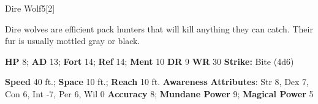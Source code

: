   \begin{monsection}{Dire Wolf}{5}[2]
    \vspace{-1em}\vspace{-1em}
    \vspace{0em}

    
      Dire wolves are efficient pack hunters that will kill anything they can catch.
      Their fur is usually mottled gray or black.
    

    \begin{spellcontent}
      \begin{spelltargetinginfo}
        \pari \textbf{HP} 8;
          \textbf{AD} 13;
          \textbf{Fort} 14;
          \textbf{Ref} 14;
          \textbf{Ment} 10
        \pari \textbf{DR} 9
        \pari \textbf{WR} 30
        \pari \textbf{Strike:}
            Bite  (4d6)
      \end{spelltargetinginfo}
    \end{spellcontent}
    \begin{monsterfooter}
      \pari \textbf{Speed} 40 ft.;
        \textbf{Space} 10 ft.;
        \textbf{Reach} 10 ft.
      \pari \textbf{Awareness} 
      \pari \textbf{Attributes}:
        Str 8, Dex 7,
        Con 6, Int -7,
        Per 6, Wil 0
      \pari \textbf{Accuracy} 8;
        \textbf{Mundane Power} 9;
      \textbf{Magical Power} 5
    \end{monsterfooter}
  \end{monsection}
  
